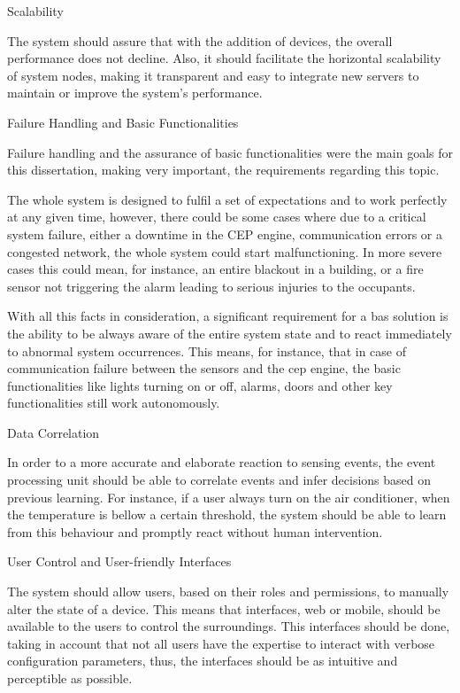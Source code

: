 \begin{Paragraph}{Scalability}

The system should assure that with the addition of devices, the overall performance does not decline. Also, it should facilitate the horizontal scalability of system nodes, making it transparent and easy to integrate new servers to maintain or improve the system's performance.

\end{Paragraph}

\begin{Paragraph}{Failure Handling and Basic Functionalities}
	
Failure handling and the assurance of basic functionalities were the main goals for this dissertation, making very important, the requirements regarding this topic.

The whole system is designed to fulfil a set of expectations and to work perfectly at any given time, however, there could be some cases where due to a critical system failure, either a downtime in the CEP engine, communication errors or a congested network, the whole system could start malfunctioning. In more severe cases this could mean, for instance, an entire blackout in a building, or a fire sensor not triggering the alarm leading to serious injuries to the occupants.

With all this facts in consideration, a significant requirement for a \ac{bas} solution is the ability to be always aware of the entire system state and to react immediately to abnormal system occurrences. This means, for instance, that in case of communication failure between the sensors and the \ac{cep} engine, the basic functionalities like lights turning on or off, alarms, doors and other key functionalities still work autonomously.
\end{Paragraph}

\begin{Paragraph}{Data Correlation}

In order to a more accurate and elaborate reaction to sensing events, the event processing unit should be able to correlate events and infer decisions based on previous learning. For instance, if a user always turn on the air conditioner, when the temperature is bellow a certain threshold, the system should be able to learn from this behaviour and promptly react without human intervention.

\end{Paragraph}

\begin{Paragraph}{User Control and User-friendly Interfaces}
	
The system should allow users, based on their roles and permissions, to manually alter the state of a device. This means that interfaces, web or mobile, should be available to the users to control the surroundings. This interfaces should be done, taking in account that not all users have the expertise to interact with verbose configuration parameters, thus, the interfaces should be as intuitive and perceptible as possible.
	
\end{Paragraph}

